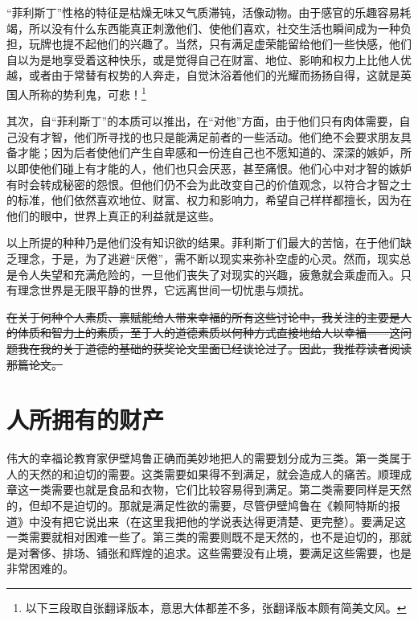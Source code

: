 \documentclass[12pt,oneside]{book}
\begin{document}
“菲利斯丁”性格的特征是枯燥无味又气质滞钝，活像动物。由于感官的乐趣容易耗竭，所以没有什么东西能真正刺激他们、使他们喜欢，社交生活也瞬间成为一种负担，玩牌也提不起他们的兴趣了。当然，只有满足虚荣能留给他们一些快感，他们自以为是地享受着这种快乐，或是觉得自己在财富、地位、影响和权力上比他人优越，或者由于常替有权势的人奔走，自觉沐浴着他们的光耀而扬扬自得，这就是英国人所称的势利鬼，可悲！\footnote{以下三段取自张翻译版本，意思大体都差不多，张翻译版本颇有简美文风。}

其次，自“菲利斯丁”的本质可以推出，在“对他”方面，由于他们只有肉体需要，自己没有才智，他们所寻找的也只是能满足前者的一些活动。他们绝不会要求朋友具备才能；因为后者使他们产生自卑感和一份连自己也不愿知道的、深深的嫉妒，所以即使他们碰上有才能的人，他们也只会厌恶，甚至痛恨。他们心中对才智的嫉妒有时会转成秘密的怨恨。但他们仍不会为此改变自己的价值观念，以符合才智之士的标准，他们依然喜欢地位、财富、权力和影响力，希望自己样样都擅长，因为在他们的眼中，世界上真正的利益就是这些。

以上所提的种种乃是他们没有知识欲的结果。菲利斯丁们最大的苦恼，在于他们缺乏理念，于是，为了逃避“厌倦”，需不断以现实来弥补空虚的心灵。然而，现实总是令人失望和充满危险的，一旦他们丧失了对现实的兴趣，疲惫就会乘虚而入。只有理念世界是无限平静的世界，它远离世间一切忧患与烦扰。

\sout{在关于何种个人素质、禀赋能给人带来幸福的所有这些讨论中，我关注的主要是人的体质和智力上的素质，至于人的道德素质以何种方式直接地给人以幸福——这问题我在我的关于道德的基础的获奖论文里面已经谈论过了。因此，我推荐读者阅读那篇论文。 }


\chapter{人所拥有的财产} 
伟大的幸福论教育家伊壁鸠鲁正确而美妙地把人的需要划分成为三类。第一类属于人的天然的和迫切的需要。这类需要如果得不到满足，就会造成人的痛苦。顺理成章这一类需要也就是食品和衣物，它们比较容易得到满足。第二类需要同样是天然的，但却不是迫切的。那就是满足性欲的需要，尽管伊壁鸠鲁在《赖阿特斯的报道》中没有把它说出来（在这里我把他的学说表达得更清楚、更完整）。要满足这一类需要就相对困难一些了。第三类的需要则既不是天然的，也不是迫切的，那就是对奢侈、排场、铺张和辉煌的追求。这些需要没有止境，要满足这些需要，也是非常困难的。 
\end{document}
